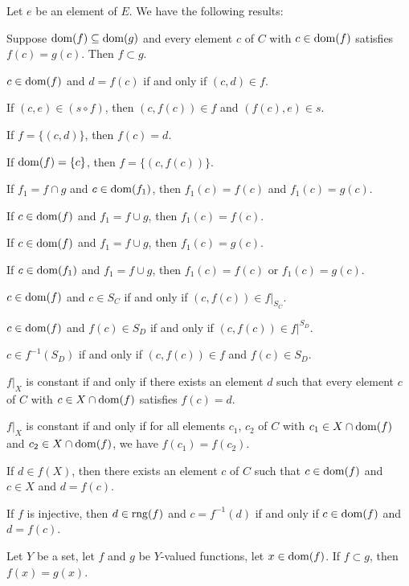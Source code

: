 \documentclass{article}
\begin{document}
Let $e$ be an element of $E$.
We have the following results:
\begin{thm}
\item\label{partfun2:45} Suppose $\operatorname{dom}(f)\subseteq\operatorname{dom}(g)$ and every
  element $c$ of $C$ with $c\in\operatorname{dom}(f)$ satisfies $f(c)=g(c)$.
  Then $f\subset g$.
\item\label{partfun2:46} $c\in\operatorname{dom}(f)$ and $d=f(c)$ if and only if
  $(c,d)\in f$.
\item\label{partfun2:47} If $(c,e)\in(s\circ f)$,
  then $(c,f(c))\in f$ and $(f(c),e)\in s$.
\item\label{partfun2:48} If $f=\{(c,d)\}$, then $f(c)=d$.
\item\label{partfun2:49} If $\operatorname{dom}(f)=\{c\}$, then $f=\{(c,f(c))\}$.
\item\label{partfun2:50} If $f_{1}=f\cap g$ and $c\in\operatorname{dom}(f_{1})$,
  then $f_{1}(c)=f(c)$ and $f_{1}(c)=g(c)$.
\item\label{partfun2:51} If $c\in\operatorname{dom}(f)$ and $f_{1}=f\cup g$, then $f_{1}(c)=f(c)$.
\item\label{partfun2:52} If $c\in\operatorname{dom}(f)$ and $f_{1}=f\cup g$, then $f_{1}(c)=g(c)$.
\item\label{partfun2:53} If $c\in\operatorname{dom}(f_{1})$ and $f_{1}=f\cup g$,
  then $f_{1}(c)=f(c)$ or $f_{1}(c)=g(c)$.
\item\label{partfun2:54} $c\in\operatorname{dom}(f)$ and $c\in S_{C}$ if and only if
  $(c,f(c))\in f|_{S_{C}}$.
\item\label{partfun2:55} $c\in\operatorname{dom}(f)$ and $f(c)\in S_{D}$ if and only
  if $(c,f(c))\in f|^{S_{D}}$.
\item\label{partfun2:56} $c\in f^{-1}(S_{D})$ if and only if
  $(c,f(c))\in f$ and $f(c)\in S_{D}$.
\item\label{partfun2:57} $f|_{X}$ is constant if and only if there
  exists an element $d$ such that every element $c$ of $C$ with $c\in X\cap\operatorname{dom}(f)$
  satisfies $f(c)=d$.
\item\label{partfun2:58} $f|_{X}$ is constant if and only if for all
  elements $c_{1}$, $c_{2}$ of $C$ with $c_{1}\in X\cap\operatorname{dom}(f)$ and
  $c_{2}\in X\cap\operatorname{dom}(f)$, we have $f(c_{1})=f(c_{2})$.
\item\label{partfun2:59} If $d\in f(X)$, then there exists an element
  $c$ of $C$ such that $c\in\operatorname{dom}(f)$ and $c\in X$ and $d=f(c)$.
\item\label{partfun2:60} If $f$ is injective, then $d\in\operatorname{rng}(f)$ and
  $c=f^{-1}(d)$ if and only if $c\in\operatorname{dom}(f)$ and $d=f(c)$.
\item\label{partfun2:61} Let $Y$ be a set, let $f$ and $g$ be $Y$-valued
  functions, let $x\in\operatorname{dom}(f)$. If $f\subset g$, then $f(x)=g(x)$.
\end{thm}
\end{document}
